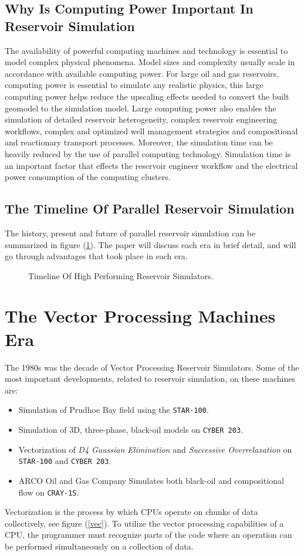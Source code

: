 \documentclass[barcolor=BrickRed,nocopyright,nolists]{asmejour}
\begin{document}
\subsection{Why Is Computing Power Important In Reservoir Simulation}
The availability of powerful computing machines and technology is essential to model complex physical phenomena. Model sizes and complexity usually scale in accordance with available computing power.
For large oil and gas reservoirs, computing power is essential to simulate any realistic physics, this large computing power helps reduce the upscaling effects needed to convert the built geomodel to the simulation model.
Large computing power also enables the simulation of detailed reservoir heterogeneity, complex reservoir engineering workflows, complex and optimized well management strategies and compositional and reactionary transport processes.
Moreover, the simulation time can be heavily reduced by the use of parallel computing technology\cite{spe142297}. Simulation time is an important factor that effects the reservoir engineer workflow and the electrical power consumption of the
computing clusters.

\subsection{The Timeline Of Parallel Reservoir Simulation}
The history, present and future of parallel reservoir simulation can be summarized in figure (\ref{timeline}). The paper will discuss each era in brief detail, and will go through advantages that took place in each era.
\begin{figure}[h]
	
	\caption{Timeline Of High Performing Reservoir Simulators.}
	\label{timeline}
\end{figure}

\section{The Vector Processing Machines Era}
The 1980s was the decade of Vector Processing Reservoir Simulators. Some of the most important developments, related to reservoir simulation, on these machines are:
\begin{itemize}
	\item Simulation of Prudhoe Bay field using the \texttt{STAR-100}\cite{spe8330}.
	\item Simulation of 3D, three-phase, black-oil models on \texttt{CYBER 203}\cite{spe9644}.
	\item Vectorization of \textit{D4 Gaussian Elimination} and \textit{Successive Overrelaxation} on \texttt{STAR-100} and \texttt{CYBER 203}\cite{spe7675}.
	\item ARCO Oil and Gas Company Simulates both black-oil and compositional flow on \texttt{CRAY-1S}\cite{spe10521}.
\end{itemize}
Vectorization is the process by which CPUs operate on chunks of data collectively, see figure (\ref{vec}). 
To utilize the vector processing capabilities of a CPU, the programmer must recognize parts of the code where an operation can be performed simultaneously on a collection of data.
\end{document}
